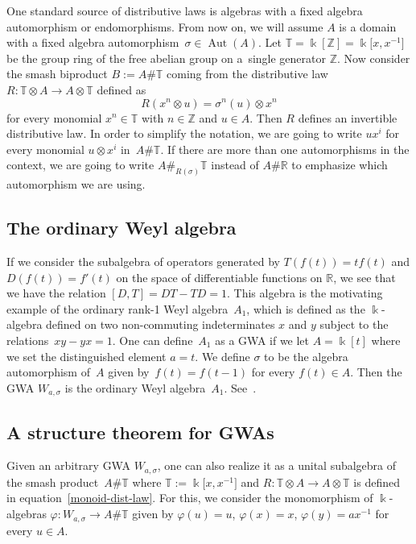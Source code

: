 \documentclass[10pt,a4paper]{amsart}
\newcommand{\B}[1]{\mathbb{#1}}
\numberwithin{equation}{section}
\begin{document}
One standard source of distributive laws is algebras with a fixed algebra automorphism or
endomorphisms. From now on, we will assume $A$ is a domain with a fixed algebra automorphism~${\sigma\in \operatorname{Aut}(A)}$. Let $\B{T}=\Bbbk[\B{Z}] = \Bbbk\big[x,x^{-1}\big]$ be the group ring of the
free abelian group on a~single generator $\B{Z}$. Now consider the smash biproduct
$B := A\# \B{T}$ coming from the distributive law $R\colon \B{T}\otimes A\to A\otimes \B{T}$
defined as
\begin{equation}\label{monoid-dist-law} R(x^n\otimes u) = \sigma^n(u)\otimes x^n
\end{equation} for every monomial $x^n\in \B{T}$ with $n\in\B{Z}$ and $u\in A$. Then $R$
defines an invertible distributive law. In order to simplify the notation, we are going
to write $ux^i$ for every monomial $u\otimes x^i$ in~$A\# \B{T}$. If there are more
than one automorphisms in the context, we are going to write $A\#_{R(\sigma)} \B{T}$
instead of $A\# \B{R}$ to emphasize which automorphism we are using.

\subsection{The ordinary Weyl algebra}\label{sect:OrdinaryWeyl}

If we consider the subalgebra of operators generated by $T(f(t)) = t f(t)$ and
$D(f(t))= f'(t)$ on the space of differentiable functions on $\B{R}$, we see that we have
the relation $[D,T] = {DT - TD = 1}$. This algebra is the motivating example of the ordinary rank-1 Weyl
algebra~$A_1$, which is defined as the $\Bbbk$-algebra defined on two non-commuting
indeterminates $x$ and $y$ subject to the relations~${xy - yx = 1}$. One can define~$A_1$ as a GWA if we let $A=\Bbbk[t]$ where we set the
distinguished element $a=t$. We define $\sigma$ to be the algebra automorphism of~$A$ given
by~${f(t) = f(t-1)}$ for every $f(t)\in A$. Then the GWA $W_{a,\sigma}$ is the ordinary Weyl
algebra~$A_1$. See~\cite[Example~2.3]{BavulaJordan:IsoProblem}.

\subsection{A structure theorem for GWAs}\label{sect:structureTheorem}

Given an arbitrary GWA $W_{a,\sigma}$, one can also realize it as a unital subalgebra of the smash
product~$A\# \B{T}$ where $\B{T}:= \Bbbk\big[x,x^{-1}\big]$ and $R\colon \B{T}\otimes A\to A\otimes \B{T}$
is defined in equation~\eqref{monoid-dist-law}. For this, we consider the monomorphism of
$\Bbbk$-algebras $\varphi\colon W_{a,\sigma}\to A\# \B{T}$ given by
$
\varphi(u) = u$, $ \varphi(x) = x$, $ \varphi(y) = ax^{-1}
$ for every $u\in A$.
\end{document}
